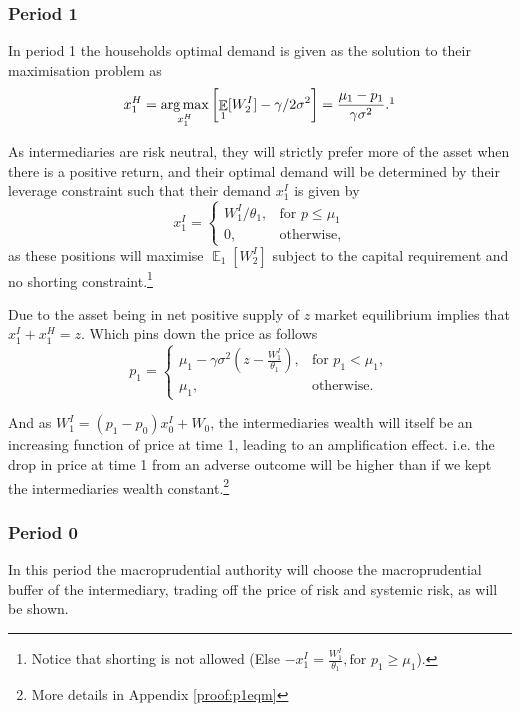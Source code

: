 \documentclass[11pt]{article}
\DeclareMathOperator{\E}{\mathbb{E}} %
\DeclareMathOperator*{\argmax}{arg\,max} %
\begin{document}
\subsubsection*{Period 1}
In period 1 the households optimal demand is given as the solution to their maximisation problem as
\begin{equation} \label{e_xH}
x^{H}_1 = \argmax_{x^H_1}\left[\E_1[W^I_2] - \gamma/2\sigma^2\right]
= \frac{\mu_1 - p_1}{\gamma\sigma^2}.\footnotemark
\end{equation}

As intermediaries are risk neutral, they will strictly prefer more of the asset when there is a positive return, and their optimal demand will be determined by their leverage constraint such that their demand $x^I_1$ is given by
\begin{equation}  \label{e_xI}
x^I_1 = \begin{cases}
 W^I_1/\theta_1, &\text{for $p \leq \mu_1$}\\
 0, &\text{otherwise,}
\end{cases}
\end{equation}
\noindent as these positions will maximise $\E_1[W^I_2]$ subject to the capital requirement and no shorting constraint.\footnote{Notice that shorting is not allowed (Else $-x^I_1 = \frac{W^I_1}{\theta_1}, \text{for } p_1 \geq \mu_1$).}


Due to the asset being in net positive supply of $z$ market equilibrium implies that $x^I_1 + x^H_1 = z$. Which pins down the price as follows
\begin{equation}
p_1 = \begin{cases}
\mu_1 - \gamma\sigma^2 \left(z-\frac{W^I_1}{\theta_1}\right), &\text{for } p_1 < \mu_1,\\
\mu_1, &\text{otherwise.}
\end{cases}
\end{equation}

And as $W^I_1 = (p_1 - p_0)x^I_0 + W_0$, the intermediaries wealth will itself be an increasing function of price at time 1, leading to an amplification effect. i.e. the drop in price at time 1 from an adverse outcome will be higher than if we kept the intermediaries wealth constant.\footnote{More details in Appendix \ref{proof:p1eqm}}

\subsubsection*{Period 0}
In this period the macroprudential authority will choose the macroprudential buffer of the intermediary, trading off the price of risk and systemic risk, as will be shown.
\end{document}
